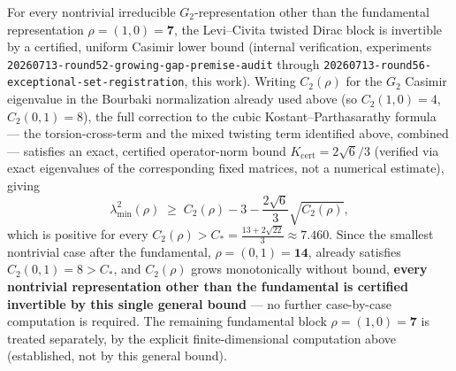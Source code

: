 \documentclass[12pt,a4paper]{article}
\begin{document}
For every nontrivial irreducible $G_2$-representation other than the fundamental
representation $\rho=(1,0)=\mathbf{7}$, the Levi--Civita twisted Dirac block is invertible
by a certified, uniform Casimir lower bound (internal verification, experiments
\texttt{20260713-round52-growing-gap-premise-audit} through
\texttt{20260713-round56-exceptional-set-registration}, this work). Writing $C_2(\rho)$ for
the $G_2$ Casimir eigenvalue in the Bourbaki normalization already used above (so
$C_2(1,0)=4$, $C_2(0,1)=8$), the full correction to the cubic Kostant--Parthasarathy
formula --- the torsion-cross-term and the mixed twisting term identified above, combined
--- satisfies an exact, certified operator-norm bound $K_{\mathrm{cert}}=2\sqrt6/3$
(verified via exact eigenvalues of the corresponding fixed matrices, not a numerical
estimate), giving
\[
  \lambda^2_{\min}(\rho) \;\geq\; C_2(\rho) - 3 - \frac{2\sqrt6}{3}\sqrt{C_2(\rho)},
\]
which is positive for every $C_2(\rho) > C_* = \frac{13+2\sqrt{22}}{3} \approx 7.460$. Since
the smallest nontrivial case after the fundamental, $\rho=(0,1)=\mathbf{14}$, already
satisfies $C_2(0,1)=8 > C_*$, and $C_2(\rho)$ grows monotonically without bound,
\textbf{every nontrivial representation other than the fundamental is certified invertible
by this single general bound} --- no further case-by-case computation is required. The
remaining fundamental block $\rho=(1,0)=\mathbf{7}$ is treated separately, by the explicit
finite-dimensional computation above (established, not by this general bound).
\end{document}
